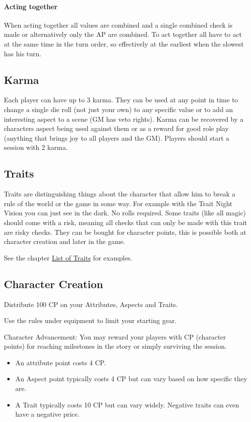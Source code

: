 \documentclass[11pt]{article}
\begin{document}
{\paragraph*{Acting together}
\label{sec:org0a48905}
When acting together all values are combined and a single combined check is made or alternatively only the AP are combined. To act together all have to act at the same time in the turn order, so effectively at the earliest when the slowest has his turn.

\subsection{Karma}
\label{sec:org3b80861}
Each player can have up to 3 karma. They can be used at any point in time to change a single die roll (not just your own) to any specific value or to add an interesting aspect to a scene (GM has veto rights). Karma can be recovered by a characters aspect being used against them or as a reward for good role play (anything that brings joy to all players and the GM). Players should start a session with 2 karma.


\subsection{Traits}
\label{sec:org2c9a819}
Traits are distinguishing things about the character that allow him to break a rule of the world or the game in some way. For example with the Trait Night Vision you can just see in the dark. No rolls required. Some traits (like all magic) should come with a risk, meaning all checks that can only be made with this trait are risky checks. They can be bought for character points, this is possible both at character creation and later in the game.

See the chapter \hyperref[sec:orga817fd6]{List of Traits} for examples.

\subsection{Character Creation}
\label{sec:org0023269}
Distribute 100 CP on your Attributes, Aspects and Traits.

Use the rules under equipment to limit your starting gear.

Character Advancement:
You may reward your players with CP (character points) for reaching milestones in the story or simply surviving the session.

\begin{itemize}
\item An attribute point costs 4 CP.
\item An Aspect point typically costs 4 CP but can vary based on how specific they are.
\item A Trait typically costs 10 CP but can vary widely. Negative traits can even have a negative price.
\end{itemize}

}
\end{document}
